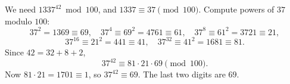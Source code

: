 We need $1337^{42}\bmod 100$, and $1337\equiv 37\pmod{100}$. Compute powers of $37$ modulo $100$:
\[37^2=1369\equiv 69,\quad 37^4\equiv 69^2=4761\equiv61,\quad 37^8\equiv61^2=3721\equiv21,\]
\[37^{16}\equiv21^2=441\equiv41,\quad 37^{32}\equiv41^2=1681\equiv81.\]
Since $42=32+8+2$,
\[37^{42}\equiv 81\cdot21\cdot69\pmod{100}.\]
Now $81\cdot21=1701\equiv1$, so $37^{42}\equiv 69$. The last two digits are $\boxed{69}$.
